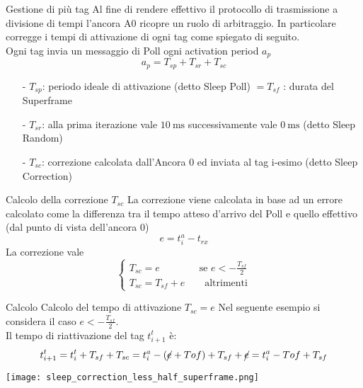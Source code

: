 \begin{frame}{Gestione di più tag}
  Al fine di rendere effettivo il protocollo di trasmissione a divisione di tempi
  l'ancora A0 ricopre un ruolo di arbitraggio. In particolare corregge i tempi di attivazione
  di ogni tag come spiegato di seguito.\\
  Ogni tag invia un messaggio di Poll ogni \alert{activation period} $a_p$
  \[
  a_p = T_{sp} + T_{sr} + T_{sc}
  \]
  \begin{itemize}
  \item[-] $T_{sp}$: periodo ideale di attivazione (detto Sleep Poll) $ = T_{sf}$ : durata del Superframe 
  \item[-] $T_{sr}$: alla prima iterazione vale $\SI{10}{\milli\second}$ successivamente vale  $\SI{0}{\milli\second}$
    (detto Sleep Random)
  \item[-] $T_{sc}$: correzione calcolata dall'\alert{Ancora 0} ed inviata al \alert{tag i-esimo} (detto Sleep Correction)
  \end{itemize}
\end{frame}

\begin{frame}{Calcolo della correzione $T_{sc}$}
  La correzione viene calcolata in base ad un errore calcolato come la differenza tra il tempo atteso
  d'arrivo del Poll e quello effettivo (dal punto di vista dell'ancora 0)
  \[
  e = t_{i}^{a} - t_{rx}
  \]
  La correzione vale
  \[
  \begin{cases}
    T_{sc} = e \quad \quad \quad \quad \text{se } e < -\frac{T_{sf}}{2}\\
    T_{sc} = T_{sf} + e \quad \quad \text{altrimenti}
  \end{cases}
  \]
\end{frame}

\begin{frame}{Calcolo Calcolo del tempo di attivazione $T_{sc} = e$}
  Nel seguente esempio si considera il caso $e < -\frac{T_{sf}}{2}$.\\
  Il tempo di riattivazione del tag $t_{i+1}^{t}$ è:
  \[
  t_{i+1}^{t} = t_{i}^{t} + T_{sf} + T_{sc} = t_i^a - (\cancel{e} + Tof) + T_{sf} + \cancel{e} = t_i^a - Tof + T_{sf} 
  \]
  \begin{center}
    \texttt{[image: sleep\_correction\_less\_half\_superframe.png]}
  \end{center}
\end{frame}


